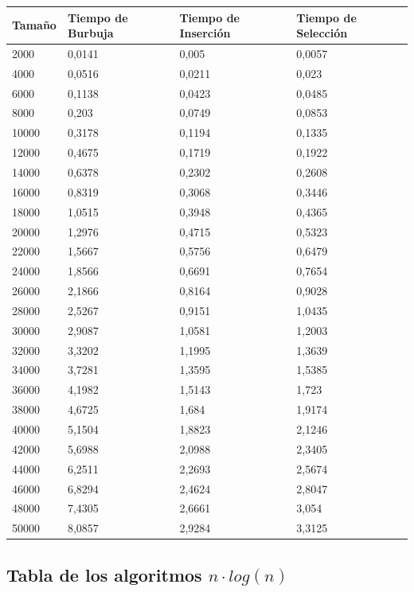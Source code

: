 \documentclass[a4paper, 11pt]{article}
\begin{document}
\begin{tabular}{|l|l|l|l|}
	\hline
	Tamaño &Tiempo de Burbuja &Tiempo de  Inserción &Tiempo de  Selección \\
	\hline
	\hline
	2000 & 0,0141 & 0,005 & 0,0057 \\
	\hline
	4000 & 0,0516 & 0,0211 & 0,023 \\
	\hline
	6000 & 0,1138 & 0,0423 & 0,0485 \\
	\hline
	8000 & 0,203 & 0,0749 & 0,0853 \\
	\hline
	10000 & 0,3178 & 0,1194 & 0,1335 \\
	\hline
	12000 & 0,4675 & 0,1719 & 0,1922 \\
	\hline
	14000 & 0,6378 & 0,2302 & 0,2608 \\
	\hline
	16000 & 0,8319 & 0,3068 & 0,3446 \\
	\hline
	18000 & 1,0515 & 0,3948 & 0,4365 \\
	\hline
	20000 & 1,2976 & 0,4715 & 0,5323 \\
	\hline
	22000 & 1,5667 & 0,5756 & 0,6479 \\
	\hline
	24000 & 1,8566 & 0,6691 & 0,7654 \\
	\hline
	26000 & 2,1866 & 0,8164 & 0,9028 \\
	\hline
	28000 & 2,5267 & 0,9151 & 1,0435 \\
	\hline
	30000 & 2,9087 & 1,0581 & 1,2003 \\
	\hline
	32000 & 3,3202 & 1,1995 & 1,3639 \\
	\hline
	34000 & 3,7281 & 1,3595 & 1,5385 \\
	\hline
	36000 & 4,1982 & 1,5143 & 1,723 \\
	\hline
	38000 & 4,6725 & 1,684 & 1,9174 \\
	\hline
	40000 & 5,1504 & 1,8823 & 2,1246 \\
	\hline
	42000 & 5,6988 & 2,0988 & 2,3405 \\
	\hline
	44000 & 6,2511 & 2,2693 & 2,5674 \\
	\hline
	46000 & 6,8294 & 2,4624 & 2,8047 \\
	\hline
	48000 & 7,4305 & 2,6661 & 3,054 \\
	\hline
	50000 & 8,0857 & 2,9284 & 3,3125 \\
	\hline
\end{tabular}

\subsection{Tabla de los algoritmos $n\cdot log(n)$ }
\end{document}
